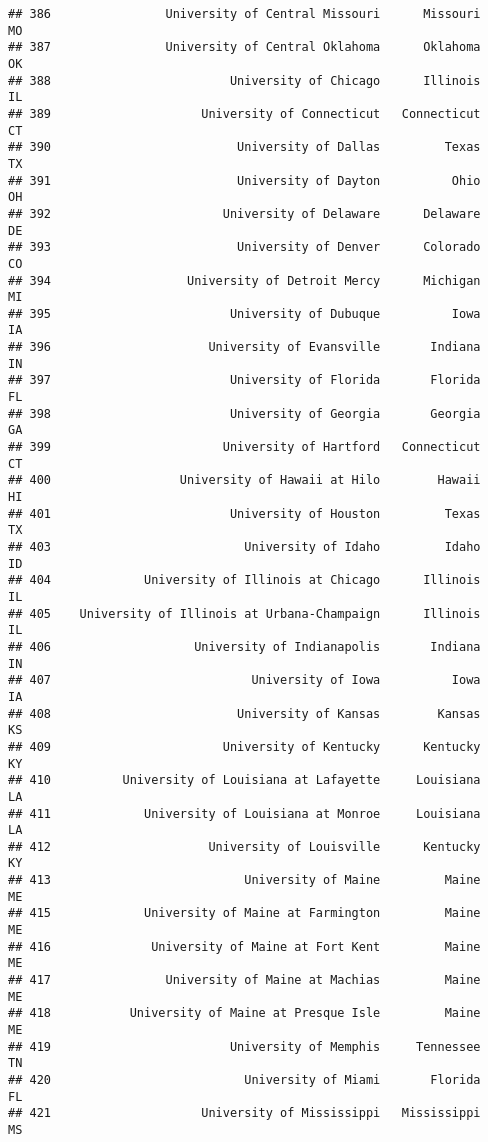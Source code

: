 \documentclass[
]{article}
\begin{document}
\begin{verbatim}
## 386                University of Central Missouri      Missouri         MO
## 387                University of Central Oklahoma      Oklahoma         OK
## 388                         University of Chicago      Illinois         IL
## 389                     University of Connecticut   Connecticut         CT
## 390                          University of Dallas         Texas         TX
## 391                          University of Dayton          Ohio         OH
## 392                        University of Delaware      Delaware         DE
## 393                          University of Denver      Colorado         CO
## 394                   University of Detroit Mercy      Michigan         MI
## 395                         University of Dubuque          Iowa         IA
## 396                      University of Evansville       Indiana         IN
## 397                         University of Florida       Florida         FL
## 398                         University of Georgia       Georgia         GA
## 399                        University of Hartford   Connecticut         CT
## 400                  University of Hawaii at Hilo        Hawaii         HI
## 401                         University of Houston         Texas         TX
## 403                           University of Idaho         Idaho         ID
## 404             University of Illinois at Chicago      Illinois         IL
## 405    University of Illinois at Urbana-Champaign      Illinois         IL
## 406                    University of Indianapolis       Indiana         IN
## 407                            University of Iowa          Iowa         IA
## 408                          University of Kansas        Kansas         KS
## 409                        University of Kentucky      Kentucky         KY
## 410          University of Louisiana at Lafayette     Louisiana         LA
## 411             University of Louisiana at Monroe     Louisiana         LA
## 412                      University of Louisville      Kentucky         KY
## 413                           University of Maine         Maine         ME
## 415             University of Maine at Farmington         Maine         ME
## 416              University of Maine at Fort Kent         Maine         ME
## 417                University of Maine at Machias         Maine         ME
## 418           University of Maine at Presque Isle         Maine         ME
## 419                         University of Memphis     Tennessee         TN
## 420                           University of Miami       Florida         FL
## 421                     University of Mississippi   Mississippi         MS

\end{verbatim}
\end{document}
